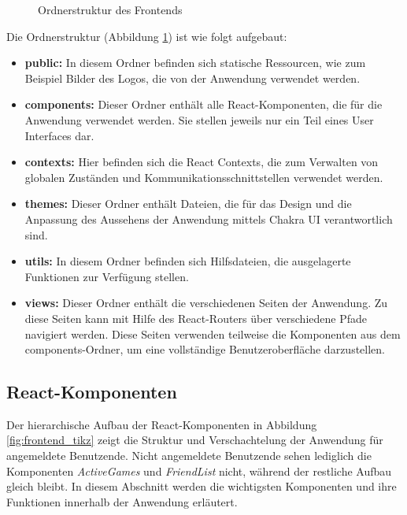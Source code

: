 \begin{figure}[!h]
\centering

\begin{minipage}{0.5\textwidth}
\end{minipage}
\caption{Ordnerstruktur des Frontends}
\label{fig:frontend_dirtree}

\end{figure}

Die Ordnerstruktur (Abbildung \ref{fig:frontend_dirtree}) ist wie folgt aufgebaut:
\begin{itemize}
\item \textbf{public:} In diesem Ordner befinden sich statische Ressourcen, wie zum Beispiel Bilder des Logos, die von der Anwendung verwendet werden.
\item \textbf{components:} Dieser Ordner enthält alle React-Komponenten, die für die Anwendung verwendet werden. Sie stellen jeweils nur ein Teil eines User Interfaces dar.
\item \textbf{contexts:} Hier befinden sich die React Contexts, die zum Verwalten von globalen Zuständen und Kommunikationsschnittstellen verwendet werden.
\item \textbf{themes:} Dieser Ordner enthält Dateien, die für das Design und die Anpassung des Aussehens der Anwendung mittels Chakra UI verantwortlich sind.
\item \textbf{utils:} In diesem Ordner befinden sich Hilfsdateien, die ausgelagerte Funktionen zur Verfügung stellen.
\item \textbf{views:} Dieser Ordner enthält die verschiedenen Seiten der Anwendung. Zu diese Seiten kann mit Hilfe des React-Routers über verschiedene Pfade navigiert werden. Diese Seiten verwenden teilweise die Komponenten aus dem components-Ordner, um eine vollständige Benutzeroberfläche darzustellen.
\end{itemize}
    
        \subsection{React-Komponenten}
        \label{sec:React-Komponenten}
Der hierarchische Aufbau der React-Komponenten in Abbildung \ref{fig:frontend_tikz} zeigt die Struktur und Verschachtelung der Anwendung für angemeldete Benutzende. Nicht angemeldete Benutzende sehen lediglich die Komponenten \textit{ActiveGames} und \textit{FriendList} nicht, während der restliche Aufbau gleich bleibt. In diesem Abschnitt werden die wichtigsten Komponenten und ihre Funktionen innerhalb der Anwendung erläutert.

